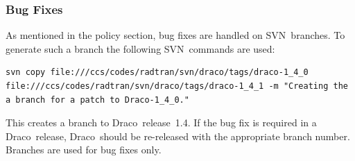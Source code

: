 \documentclass[note]{newmemo}
\newcommand{\draco}{{\normalfont\small\sffamily Draco}}
\newcommand{\cvs}{\textsf{CVS}}
\newcommand{\svn}{\textsf{SVN}}
\begin{document}


\subsubsection{Bug Fixes}

As mentioned in the policy section, bug fixes are handled on
\svn\ branches.  To generate such a branch the following
\svn\ commands are used:
\begin{lstlisting}[basicstyle=\footnotesize, xleftmargin=2.0in, 
  xrightmargin=2.0in]
svn copy file:///ccs/codes/radtran/svn/draco/tags/draco-1_4_0 file:///ccs/codes/radtran/svn/draco/tags/draco-1_4_1 -m "Creating the a branch for a patch to Draco-1_4_0."
\end{lstlisting}
This creates a branch to \draco\ release~1.4.  If the bug fix is
required in a \draco\ release, \draco\ should be re-released with the
appropriate branch number.  Branches are used for bug fixes only.
\end{document}

